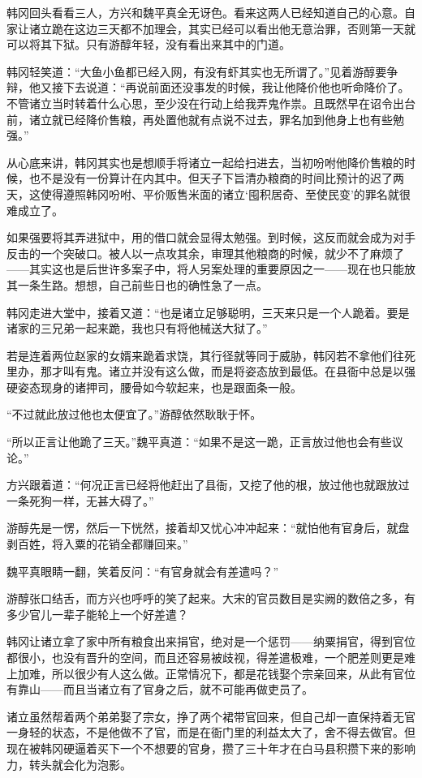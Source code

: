 韩冈回头看看三人，方兴和魏平真全无讶色。看来这两人已经知道自己的心意。自家让诸立跪在这边三天都不加理会，其实已经可以看出他无意治罪，否则第一天就可以将其下狱。只有游醇年轻，没有看出来其中的门道。

韩冈轻笑道：“大鱼小鱼都已经入网，有没有虾其实也无所谓了。”见着游醇要争辩，他又接下去说道：“再说前面还没事发的时候，我让他降价他也听命降价了。不管诸立当时转着什么心思，至少没在行动上给我弄鬼作祟。且既然早在诏令出台前，诸立就已经降价售粮，再处置他就有点说不过去，罪名加到他身上也有些勉强。”

从心底来讲，韩冈其实也是想顺手将诸立一起给扫进去，当初吩咐他降价售粮的时候，也不是没有一份算计在内其中。但天子下旨清办粮商的时间比预计的迟了两天，这使得遵照韩冈吩咐、平价贩售米面的诸立‘囤积居奇、至使民变’的罪名就很难成立了。

如果强要将其弄进狱中，用的借口就会显得太勉强。到时候，这反而就会成为对手反击的一个突破口。被人以一点攻其余，审理其他粮商的时候，就少不了麻烦了——其实这也是后世许多案子中，将人另案处理的重要原因之一——现在也只能放其一条生路。想想，自己前些日也的确性急了一点。

韩冈走进大堂中，接着又道：“也是诸立足够聪明，三天来只是一个人跪着。要是诸家的三兄弟一起来跪，我也只有将他械送大狱了。”

若是连着两位赵家的女婿来跪着求饶，其行径就等同于威胁，韩冈若不拿他们往死里办，那才叫有鬼。诸立并没有这么做，而是将姿态放到最低。在县衙中总是以强硬姿态现身的诸押司，腰骨如今软起来，也是跟面条一般。

“不过就此放过他也太便宜了。”游醇依然耿耿于怀。

“所以正言让他跪了三天。”魏平真道：“如果不是这一跪，正言放过他也会有些议论。”

方兴跟着道：“何况正言已经将他赶出了县衙，又挖了他的根，放过他也就跟放过一条死狗一样，无甚大碍了。”

游醇先是一愣，然后一下恍然，接着却又忧心冲冲起来：“就怕他有官身后，就盘剥百姓，将入粟的花销全都赚回来。”

魏平真眼睛一翻，笑着反问：“有官身就会有差遣吗？”

游醇张口结舌，而方兴也呼呼的笑了起来。大宋的官员数目是实阙的数倍之多，有多少官儿一辈子能轮上一个好差遣？

韩冈让诸立拿了家中所有粮食出来捐官，绝对是一个惩罚——纳粟捐官，得到官位都很小，也没有晋升的空间，而且还容易被歧视，得差遣极难，一个肥差则更是难上加难，所以很少有人这么做。正常情况下，都是花钱娶个宗亲回来，从此有官位有靠山——而且当诸立有了官身之后，就不可能再做吏员了。

诸立虽然帮着两个弟弟娶了宗女，挣了两个裙带官回来，但自己却一直保持着无官一身轻的状态，不是他做不了官，而是在衙门里的利益太大了，舍不得去做官。但现在被韩冈硬逼着买下一个不想要的官身，攒了三十年才在白马县积攒下来的影响力，转头就会化为泡影。

